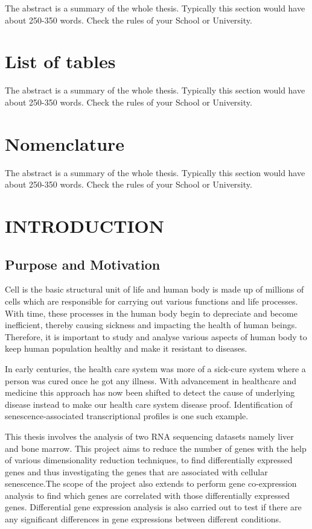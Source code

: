 \documentclass{sydneythesis}
\begin{document}
The abstract is a summary of the whole thesis. Typically this section
would have about 250-350 words. Check the rules of your School or
University.

\chapter*{List of tables}\label{list-of-tables}

The abstract is a summary of the whole thesis. Typically this section
would have about 250-350 words. Check the rules of your School or
University.

\chapter*{Nomenclature}\label{nomenclature}

The abstract is a summary of the whole thesis. Typically this section
would have about 250-350 words. Check the rules of your School or
University.

\chapter{INTRODUCTION}\label{introduction}

\section{Purpose and Motivation}\label{purpose-and-motivation}

Cell is the basic structural unit of life and human body is made up of
millions of cells which are responsible for carrying out various
functions and life processes. With time, these processes in the human
body begin to depreciate and become inefficient, thereby causing
sickness and impacting the health of human beings. Therefore, it is
important to study and analyse various aspects of human body to keep
human population healthy and make it resistant to diseases.

In early centuries, the health care system was more of a sick-cure
system where a person was cured once he got any illness. With
advancement in healthcare and medicine this approach has now been
shifted to detect the cause of underlying disease instead to make our
health care system disease proof. Identification of
senescence-associated transcriptional profiles is one such example.

This thesis involves the analysis of two RNA sequencing datasets namely
liver and bone marrow. This project aims to reduce the number of genes
with the help of various dimensionality reduction techniques, to find
differentially expressed genes and thus investigating the genes that are
associated with cellular senescence.The scope of the project also
extends to perform gene co-expression analysis to find which genes are
correlated with those differentially expressed genes. Differential gene
expression analysis is also carried out to test if there are any
significant differences in gene expressions between different
conditions.
\end{document}
